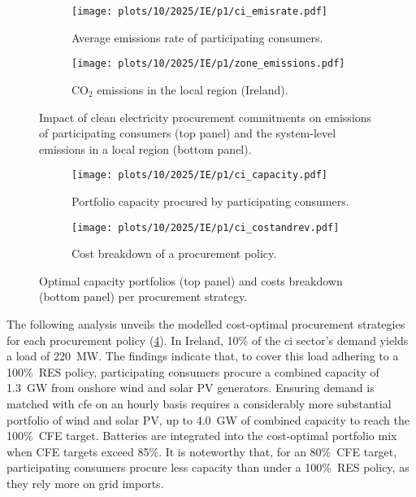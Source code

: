 \begin{figure}[t]
    \centering
    \begin{subfigure}[t]{0.95\columnwidth}
        \centering
        \caption{Average emissions rate of participating consumers.}
        \texttt{[image: plots/10/2025/IE/p1/ci\_emisrate.pdf]}
        \label{fig:10-2025-IE-p1-ci_emisrate}
    \end{subfigure}
    \begin{subfigure}[t]{0.95\columnwidth}
        \centering
        \vspace{-0.2cm}
        \caption{CO$_2$ emissions in the local region (Ireland).}
        \texttt{[image: plots/10/2025/IE/p1/zone\_emissions.pdf]}
        \label{fig:10-2025-IE-p1-zone_emissions}
    \end{subfigure}
    \caption{Impact of clean electricity procurement commitments on emissions of participating consumers (top panel) and the system-level emissions in a local region (bottom panel).}
    \label{fig:10-2025-IE-p1-emissions}
\end{figure}

\begin{figure}[t]
    \centering
    \begin{subfigure}[t]{0.95\columnwidth}
        \centering
        \caption{Portfolio capacity procured by participating consumers.}
        \texttt{[image: plots/10/2025/IE/p1/ci\_capacity.pdf]}
        \label{fig:10-2025-IE-p1-ci_capacity}
    \end{subfigure}
    \begin{subfigure}[t]{0.95\columnwidth}
        \centering
        \vspace{-0.2cm}
        \caption{Cost breakdown of a procurement policy.}
        \texttt{[image: plots/10/2025/IE/p1/ci\_costandrev.pdf]}
        \label{fig:10-2025-IE-p1-ci_costandrev}
    \end{subfigure}
    \caption{Optimal capacity portfolios (top panel) and costs breakdown (bottom panel) per procurement strategy.}
    \label{fig:10-2025-IE-p1-ci_procurement}
\end{figure}

The following analysis unveils the modelled cost-optimal procurement strategies for each procurement policy (\cref{fig:10-2025-IE-p1-ci_capacity}).
In Ireland, 10\% of the \gls{ci} sector's demand yields a load of 220~MW.
The findings indicate that, to cover this load adhering to a 100\%~RES policy, participating consumers procure a combined capacity of 1.3~GW from onshore wind and solar PV generators.
Ensuring demand is matched with \gls{cfe} on an hourly basis requires a considerably more substantial portfolio of wind and solar PV, up to 4.0~GW of combined capacity to reach the 100\%~CFE target.
Batteries are integrated into the cost-optimal portfolio mix when CFE targets exceed 85\%.
It is noteworthy that, for an 80\%~CFE target, participating consumers procure less capacity than under a 100\%~RES policy, as they rely more on grid imports.

